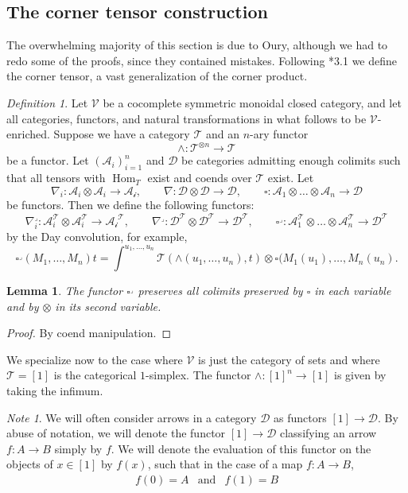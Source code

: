 \documentclass[leqno]{article}
\numberwithin{equation}{subsection}
\theoremstyle{plain}   %
\newtheorem{lemma}[equation]{Lemma}
\theoremstyle{remark}
\newtheorem{note}[equation]{Note}
\newtheorem{defn}[equation]{Definition}
\theoremstyle{plain}
\DeclareMathOperator{\Hom}{Hom}
\begin{document}
\subsection{The corner tensor construction}\label{cornertensor} 
The overwhelming majority of this section is due to Oury, although we had to redo some of the proofs, since they contained mistakes. Following \cite{oury}*{3.1} we define the corner tensor, a vast generalization of the corner product.
\begin{defn}
	Let \(\mathcal{V}\) be a cocomplete symmetric monoidal closed category, and let all categories, functors, and natural transformations in what follows to be \(\mathcal{V}\)-enriched.  Suppose we have a category \(\mathcal{T}\) and an \(n\)-ary functor \[\wedge:\mathcal{T}^{\otimes n} \to \mathcal{T}\] be a functor.  Let \((\mathcal{A}_i)_{i=1}^n\) and \(\mathcal{D}\) be categories admitting enough colimits such that all tensors with \(\Hom_T\) exist and coends over \(\mathcal{T}\) exist.  Let
	\[\nabla_i: \mathcal{A}_i \otimes \mathcal{A}_i \to \mathcal{A_i}, \qquad \nabla:\mathcal{D}\otimes \mathcal{D} \to \mathcal{D}, \qquad \square:\mathcal{A}_1\otimes\dots \otimes \mathcal{A}_n \to \mathcal{D}\]
	be functors.  Then we define the following functors:
	\[\nabla^\lrcorner_i: \mathcal{A}^\mathcal{T}_i \otimes \mathcal{A}^\mathcal{T}_i \to \mathcal{A_i}^\mathcal{T}, \qquad \nabla^\lrcorner:\mathcal{D}^\mathcal{T}\otimes \mathcal{D}^\mathcal{T} \to \mathcal{D}^\mathcal{T}, \qquad \square^\lrcorner: \mathcal{A}_1^\mathcal{T}\otimes\dots \otimes \mathcal{A}_n^\mathcal{T} \to \mathcal{D}^\mathcal{T}\]
	by the Day convolution, for example,
	\[\square^\lrcorner(M_1,\dots,M_n)t = \int^{u_1,\dots,u_n} \mathcal{T}(\wedge(u_1,\dots,u_n),t) \otimes \square(M_1(u_1),\dots,M_n(u_n).\]
\end{defn}
\begin{lemma}
	The functor \(\square^\lrcorner\) preserves all colimits preserved by \(\square\) in each variable and by \(\otimes\) in its second variable.  
\end{lemma}
\begin{proof} By coend manipulation.
\end{proof}
We specialize now to the case where \(\mathcal{V}\) is just the category of sets and where \(\mathcal{T}=[1]\) is the categorical \(1\)-simplex.  The functor \(\wedge:[1]^n \to [1]\) is given by taking the infimum.   
\begin{note}
	We will often consider arrows in a category \(\mathcal{D}\) as functors \([1]\to \mathcal{D}\).  By abuse of notation, we will denote the functor \([1]\to \mathcal{D}\) classifying an arrow \(f:A\to B\) simply by \(f\).  We will denote the evaluation of this functor on the objects of \(x\in [1]\) by \(f(x)\), such that in the case of a map \(f:A\to B\),
	\begin{eqnarray}
		f(0) = A &\text{and}& f(1) = B
	\end{eqnarray} 
\end{note}
\end{document}
